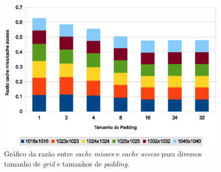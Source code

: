 \begin{figure}[h]
    \centering
    \includegraphics[width=.8\textwidth]{figures/padding}

    \caption{Gráfico da razão entre \textit{cache misses} e \textit{cache access} para diversos tamanho de \textit{grid} e tamanhos de \textit{padding}.}
    \label{fig:padding}
\end{figure}


